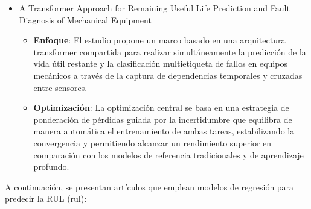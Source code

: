 \documentclass[IB]{TFUOC}
\begin{document}
\begin{itemize}
\begin{itemize}
                \gls{lstm} estructurada en múltiples ramas independientes, donde cada una se encarga de predecir de
                forma específica la probabilidad de fallo para un componente determinado de la máquina. Para resolver
                esta tarea de naturaleza binaria, cada rama incorpora una función de activación sigmoide en su capa de
                salida y emplea la entropía cruzada binaria como función de pérdida para evaluar la discrepancia con las
                etiquetas reales.
          \item \textbf{Ventana temporal y alerta temprana}: El modelo prescinde de los tamaños fijos convencionales e
                implementa una estrategia adaptativa basada en optimización bayesiana para ajustar dinámicamente el
                tamaño de la ventana de entrada. Mediante el uso de técnicas de ventana deslizante superpuesta, el
                sistema equilibra el contexto histórico necesario para capturar las dinámicas de degradación y maximiza
                la precisión de las predicciones anticipadas para evitar fallos operativos inesperados
        \end{itemize}
  \item A Transformer Approach for Remaining Useful Life Prediction and Fault Diagnosis of Mechanical Equipment
        \cite{liu2026transformer}
        \begin{itemize}
          \item \textbf{Enfoque}: El estudio propone un marco basado en una arquitectura \gls{transformer} compartida
                para realizar simultáneamente la predicción de la vida útil restante y la clasificación multietiqueta de
                fallos en equipos mecánicos a través de la captura de dependencias temporales y cruzadas entre sensores.
          \item \textbf{Optimización}: La optimización central se basa en una estrategia de ponderación de pérdidas
                guiada por la incertidumbre que equilibra de manera automática el entrenamiento de ambas tareas,
                estabilizando la convergencia y permitiendo alcanzar un rendimiento superior en comparación con los
                modelos de referencia tradicionales y de aprendizaje profundo.
        \end{itemize}
\end{itemize}

A continuación, se presentan artículos que emplean modelos de regresión para predecir la \gls{RUL} (\gls{rul}):
\end{document}
